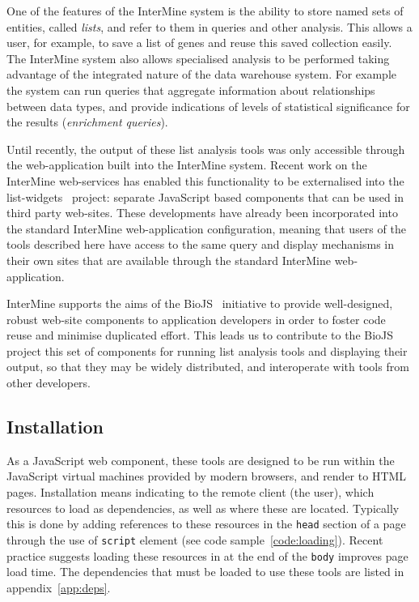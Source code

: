 \documentclass[10pt,a4paper,twocolumn]{article}
\begin{document}
One of the features of the InterMine system is the ability to store named sets
of entities, called \emph{lists}, and refer to them in queries and other
analysis. This allows a user, for example, to save a list of genes and reuse
this saved collection easily. The InterMine system also allows specialised
analysis to be performed taking advantage of the integrated nature of the data
warehouse system. For example the system can run queries that aggregate
information about relationships between data types, and provide indications of
levels of statistical significance for the results (\emph{enrichment queries}).

Until recently, the output of these list analysis tools was only accessible
through the web-application built into the InterMine system. Recent work on the
InterMine web-services has enabled this functionality to be externalised into
the list-widgets~\cite{site:list-widgets} project: separate JavaScript based
components that can be used in third party web-sites.  These developments have
already been incorporated into the standard InterMine web-application
configuration, meaning that users of the tools described here have access to the
same query and display mechanisms in their own sites that are available through
the standard InterMine web-application.

InterMine supports the aims of the BioJS~\cite{biojs} initiative to provide
well-designed, robust web-site components to application developers in order to
foster code reuse and minimise duplicated effort. This leads us to contribute to
the BioJS project this set of components for running list analysis tools and
displaying their output, so that they may be widely distributed, and
interoperate with tools from other developers.

\subsection*{Installation}

As a JavaScript web component, these tools are designed to be run within the
JavaScript virtual machines provided by modern browsers, and render to HTML
pages. Installation means indicating to the remote client (the user), which
resources to load as dependencies, as well as where these are located. Typically
this is done by adding references to these resources in the \texttt{head}
section of a page through the use of \texttt{script} element (see code
sample~\ref{code:loading}). Recent practice suggests loading these resources in
at the end of the \texttt{body} improves page load time. The dependencies that
must be loaded to use these tools are listed in appendix~\ref{app:deps}.
\end{document}
